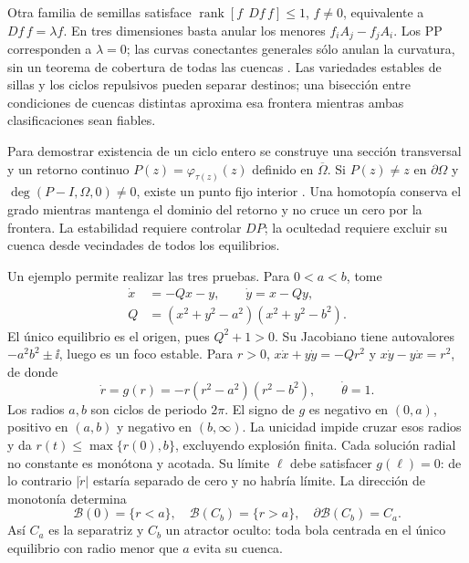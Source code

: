 Otra familia de semillas satisface
$\operatorname{rank}[f\ \ Df\,f]\le1$, $f\ne0$, equivalente a
$Df\,f=\lambda f$. En tres dimensiones basta anular los menores
$f_iA_j-f_jA_i$. Los PP corresponden a $\lambda=0$; las curvas
conectantes generales sólo anulan la curvatura, sin un teorema de
cobertura de todas las cuencas \cite{GilmoreEtAl2010Connecting}.
Las variedades estables de sillas y los ciclos repulsivos pueden separar
destinos; una bisección entre condiciones de cuencas distintas aproxima
esa frontera mientras ambas clasificaciones sean fiables.

Para demostrar existencia de un ciclo entero se construye una sección
transversal y un retorno continuo $P(z)=\varphi_{\tau(z)}(z)$ definido
en $\overline\Omega$. Si $P(z)\ne z$ en $\partial\Omega$ y
$\deg(P-I,\Omega,0)\ne0$, existe un punto fijo interior
\cite{Amster2021MetodosTopologicos}. Una homotopía conserva el grado
mientras mantenga el dominio del retorno y no cruce un cero por la
frontera. La estabilidad requiere controlar $DP$; la ocultedad requiere
excluir su cuenca desde vecindades de todos los equilibrios.

Un ejemplo permite realizar las tres pruebas. Para $0<a<b$, tome
\begin{equation}
 \begin{aligned}
 \dot x&=-Qx-y,\qquad\dot y=x-Qy,\\
 Q&=(x^2+y^2-a^2)(x^2+y^2-b^2).
 \end{aligned}
 \label{bre:geo:cycle}
\end{equation}
El único equilibrio es el origen, pues $Q^2+1>0$. Su Jacobiano tiene
autovalores $-a^2b^2\pm\ii$, luego es un foco estable. Para $r>0$,
$x\dot x+y\dot y=-Qr^2$ y $x\dot y-y\dot x=r^2$, de donde
\begin{equation}
 \dot r=g(r)=-r(r^2-a^2)(r^2-b^2),\qquad\dot\theta=1.
 \label{bre:geo:radial}
\end{equation}
Los radios $a,b$ son ciclos de periodo $2\pi$. El signo de $g$ es
negativo en $(0,a)$, positivo en $(a,b)$ y negativo en $(b,\infty)$.
La unicidad impide cruzar esos radios y da
$r(t)\le\max\{r(0),b\}$, excluyendo explosión finita. Cada solución
radial no constante es monótona y acotada. Su límite $\ell$ debe
satisfacer $g(\ell)=0$: de lo contrario $|\dot r|$ estaría separado
de cero y no habría límite. La dirección de monotonía determina
\begin{equation}
 \mathcal B(0)=\{r<a\},\quad
 \mathcal B(C_b)=\{r>a\},\quad
 \partial\mathcal B(C_b)=C_a.
 \label{bre:geo:basins}
\end{equation}
Así $C_a$ es la separatriz y $C_b$ un atractor oculto: toda bola
centrada en el único equilibrio con radio menor que $a$ evita su cuenca.

